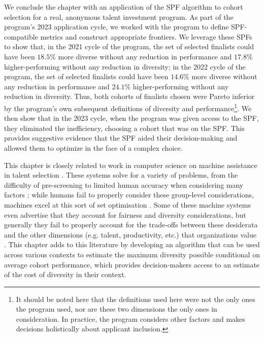 We conclude the chapter with an application of the SPF algorithm to cohort selection for a real, anonymous talent investment program. As part of the program's 2023 application cycle, we worked with the program to define SPF-compatible metrics and construct appropriate frontiers. We leverage these SPFs to show that, in the 2021 cycle of the program, the set of selected finalists could have been $18.5\%$ more diverse without any reduction in performance and $17.8\%$ higher-performing without any reduction in diversity; in the 2022 cycle of the program, the set of selected finalists could have been $14.6\%$ more diverse without any reduction in performance and $24.1\%$ higher-performing without any reduction in diversity. Thus, both cohorts of finalists chosen were Pareto inferior by the program's own subsequent definitions of diversity and performance\footnote{It should be noted here that the definitions used here were not the only ones the program used, nor are these two dimensions the only ones in consideration. In practice, the program considers other factors and makes decisions holistically about applicant inclusion.}. We then show that in the 2023 cycle, when the program was given access to the SPF, they eliminated the inefficiency, choosing a cohort that was on the SPF. This provides suggestive evidence that the SPF aided their decision-making and allowed them to optimize in the face of a complex choice.

This chapter is closely related to work in computer science on machine assistance in talent selection \cite{dwivedi2021artificial, tambe2019artificial, raghavan2020mitigating}. These systems solve for a variety of problems, from the difficulty of pre-screening to limited human accuracy when considering many factors \cite{tambe2019artificial}; while humans fail to properly consider these group-level considerations, machines excel at this sort of set optimisation \cite{krause2014submodular}. Some of these machine systems even advertise that they account for fairness and diversity considerations, but generally they fail to properly account for the trade-offs between these desiderata and the other dimensions (e.g. talent, productivity, etc.) that organizations value \cite{raghavan2020mitigating, gillet2011diversity,huppenkothen2020entrofy}. This chapter adds to this literature by developing an algorithm that can be used across various contexts to estimate the maximum diversity possible conditional on average cohort performance, which provides decision-makers access to an estimate of the cost of diversity in their context. 

